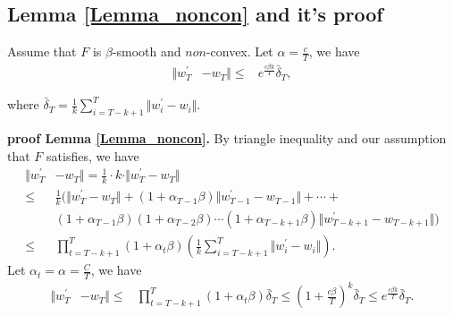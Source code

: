 \subsection{Lemma \ref{Lemma_noncon} and it's proof}\label{proof-Lemma_noncon}
\begin{lemma}\label{Lemma_noncon}
Assume that $F$ is $\beta$-smooth and $non$-convex. Let $\alpha = \frac{c}{T}$, we have 
  \begin{equation}
  \begin{aligned}
   \Vert w^{\prime}_{T}& - w_{T} \Vert \leq &e^\frac{c\beta k}{T}\bar{\delta}_{T},
  \end{aligned}
 \end{equation}
\end{lemma}
where $\bar{\delta}_{T}= \frac{1}{k} \sum_{i=T-k+1}^{T}\Vert w^{\prime}_{i} - w_{i} \Vert$.

\textbf{proof Lemma \ref{Lemma_noncon}.} 
By triangle inequality and our assumption that $F$ satisfies, we have
 \begin{equation}
  \begin{aligned}
   \Vert w^{\prime}_{T}& - w_{T} \Vert = \frac{1}{k} \cdot k \cdot \Vert w^{\prime}_{T} - w_{T} \Vert \\
   \leq & \frac{1}{k} ( \Vert w^{\prime}_{T} - w_{T} \Vert + (1+\alpha_{T-1}\beta)\Vert w^{\prime}_{T-1} - w_{T-1} \Vert + \cdots + \\&(1+\alpha_{T-1}\beta)(1+\alpha_{T-2}\beta)\cdots(1+\alpha_{T-k+1}\beta)\Vert w^{\prime}_{T-k+1} - w_{T-k+1} \Vert ) \\
   \leq & \prod_{t=T-k+1}^{T} (1+\alpha_t\beta)\left(\frac{1}{k} \sum_{i=T-k+1}^{T}\Vert w^{\prime}_{i} - w_{i} \Vert\right).
    \end{aligned}
 \end{equation}
Let $\alpha_t = \alpha = \frac{C}{T}$, we have
  \begin{equation}
  \begin{aligned}
   \Vert w^{\prime}_{T}& - w_{T} \Vert \leq &\prod_{t=T-k+1}^{T} (1+\alpha_t\beta)\bar{\delta}_{T} \leq \left(1+ \frac{c\beta}{T}\right)^k\bar{\delta}_{T} \leq e^\frac{c\beta k}{T}\bar{\delta}_{T}.
  \end{aligned}
 \end{equation}


